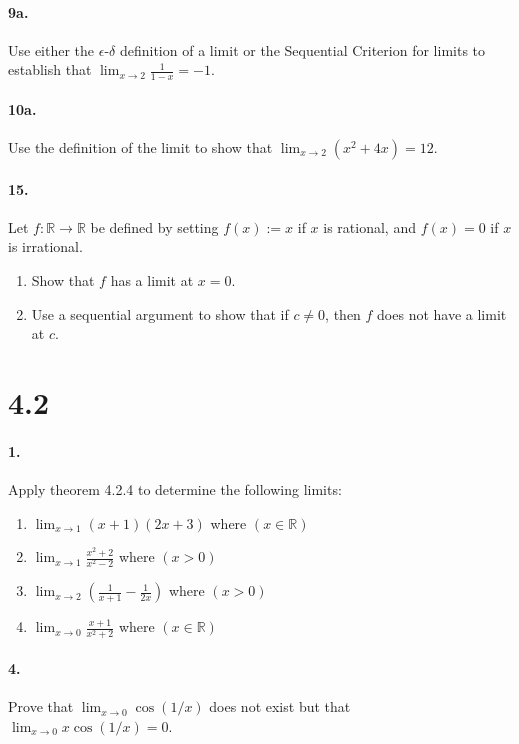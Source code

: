 \documentclass[12pt]{article}
\newcommand\R{\mathbb{R}}
\theoremstyle{remark}
\begin{document}
\paragraph{9a.} Use either the $\epsilon$-$\delta$ definition of a limit or the Sequential Criterion for limits to establish that $\lim_{x \to 2} \frac{1}{1 - x} = -1$.

\paragraph{10a.} Use the definition of the limit to show that $\lim_{x \to 2} (x^2 + 4x) = 12$.

\paragraph{15.} Let $f: \R \to \R$ be defined by setting $f(x) := x$ if $x$ is rational, and $f(x) = 0$ if $x$ is irrational.
\begin{enumerate}[label=(\alph*)]
    \item Show that $f$ has a limit at $x = 0$.
    \item Use a sequential argument to show that if $c \neq 0$, then $f$ does not have a limit at $c$.
\end{enumerate}

\section*{4.2}
\paragraph{1.} Apply theorem 4.2.4 to determine the following limits:
\begin{enumerate}[label=(\alph*)]
    \item $\lim_{x \to 1} (x + 1)(2x + 3)$ where $(x \in \R)$
    \item $\lim_{x \to 1} \frac{x^2 + 2}{x^2 - 2}$ where $(x > 0)$
    \item $\lim_{x \to 2} (\frac{1}{x + 1} - \frac{1}{2x})$ where $(x > 0)$
    \item $\lim_{x \to 0} \frac{x + 1}{x^2 + 2}$ where $(x \in \R)$
\end{enumerate}

\paragraph{4.} Prove that $\lim_{x \to 0} \cos(1/x)$ does not exist but that $\lim_{x \to 0} x \cos(1/x) = 0$.
\end{document}
